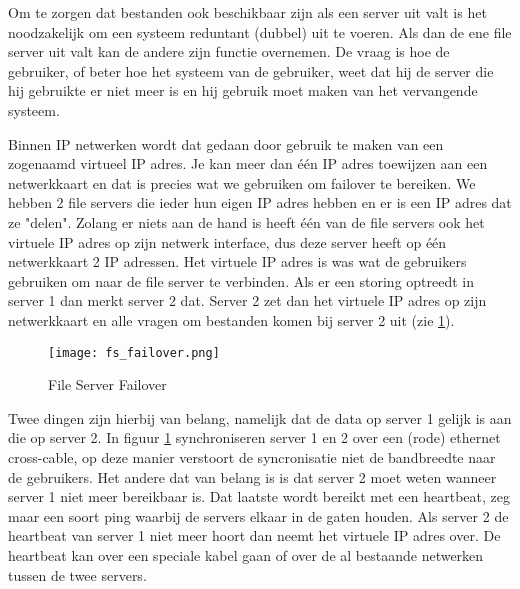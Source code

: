 Om te zorgen dat bestanden ook beschikbaar zijn als een server uit valt is het noodzakelijk om een systeem reduntant (dubbel) uit te voeren. Als dan de ene file server uit valt kan de andere zijn  functie overnemen. De vraag is hoe de gebruiker, of beter hoe het systeem van de gebruiker, weet dat hij de server die hij gebruikte er niet meer is en hij gebruik moet maken van het vervangende systeem.

Binnen IP netwerken wordt dat gedaan door gebruik te maken van een zogenaamd virtueel IP adres. Je kan meer dan \'e\'en IP adres toewijzen aan een netwerkkaart en dat is precies wat we gebruiken om failover te bereiken. We hebben 2 file servers die ieder hun eigen IP adres hebben en er is een IP adres dat ze "delen". Zolang er niets aan de hand is heeft \'e\'en van de file servers ook het virtuele IP adres op zijn netwerk interface, dus deze server heeft op \'e\'en netwerkkaart 2 IP adressen. Het virtuele IP adres is was wat de gebruikers gebruiken om naar de file server te verbinden. Als er een storing optreedt in server 1 dan merkt server 2 dat. Server 2 zet dan het virtuele IP adres op zijn netwerkkaart en alle vragen om bestanden komen bij server 2 uit (zie \ref{FS_failover}).

\begin{figure}[h!]
	\texttt{[image: fs\_failover.png]}
	\caption{File Server Failover}
	\label{FS_failover}
\end{figure}

Twee dingen zijn hierbij van belang, namelijk dat de data op server 1 gelijk is aan die op server 2. In figuur \ref{FS_failover} synchroniseren server 1 en 2 over een (rode) ethernet cross-cable, op deze manier verstoort de syncronisatie niet de bandbreedte naar de gebruikers. Het andere dat van belang is is dat server 2 moet weten wanneer server 1 niet meer bereikbaar is. Dat laatste wordt bereikt met een heartbeat, zeg maar een soort ping waarbij de servers elkaar in de gaten houden. Als server 2 de heartbeat van server 1 niet meer hoort dan neemt het virtuele IP adres over. De heartbeat kan over een speciale kabel gaan of over de al bestaande netwerken tussen de twee servers.
